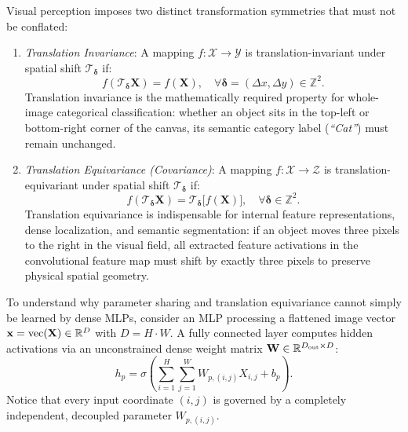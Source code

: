 Visual perception imposes two distinct transformation symmetries that must not be conflated:
\begin{enumerate}[leftmargin=*]
  \item \textit{Translation Invariance}: A mapping $f: \mathcal{X} \to \mathcal{Y}$ is translation-invariant under spatial shift $\mathcal{T}_{\boldsymbol{\delta}}$ if:
    \begin{equation}
    f\left( \mathcal{T}_{\boldsymbol{\delta}} \mathbf{X} \right) = f(\mathbf{X}), \quad \forall \boldsymbol{\delta} = (\Delta x, \Delta y) \in \mathbb{Z}^2.
    \label{eq:translation_invariance_math}
    \end{equation}
    Translation invariance is the mathematically required property for whole-image categorical classification: whether an object sits in the top-left or bottom-right corner of the canvas, its semantic category label (\textit{``Cat''}) must remain unchanged.
  
  \item \textit{Translation Equivariance (Covariance)}: A mapping $f: \mathcal{X} \to \mathcal{Z}$ is translation-equivariant under spatial shift $\mathcal{T}_{\boldsymbol{\delta}}$ if:
    \begin{equation}
    f\left( \mathcal{T}_{\boldsymbol{\delta}} \mathbf{X} \right) = \mathcal{T}_{\boldsymbol{\delta}} \big[ f(\mathbf{X}) \big], \quad \forall \boldsymbol{\delta} \in \mathbb{Z}^2.
    \label{eq:translation_equivariance_math}
    \end{equation}
    Translation equivariance is indispensable for internal feature representations, dense localization, and semantic segmentation: if an object moves three pixels to the right in the visual field, all extracted feature activations in the convolutional feature map must shift by exactly three pixels to preserve physical spatial geometry.
\end{enumerate}

To understand why parameter sharing and translation equivariance cannot simply be learned by dense MLPs, consider an MLP processing a flattened image vector $\mathbf{x} = \operatorname{vec}(\mathbf{X}) \in \mathbb{R}^{D}$ with $D = H \cdot W$. A fully connected layer computes hidden activations via an unconstrained dense weight matrix $\mathbf{W} \in \mathbb{R}^{D_{\text{out}} \times D}$:
\begin{equation}
h_p = \sigma\left( \sum_{i=1}^H \sum_{j=1}^W W_{p, (i, j)} X_{i, j} + b_p \right).
\label{eq:mlp_dense_coordinate_dot}
\end{equation}
Notice that every input coordinate $(i, j)$ is governed by a completely independent, decoupled parameter $W_{p, (i, j)}$.

